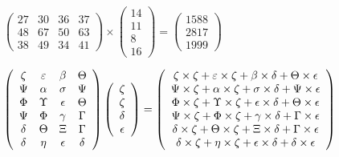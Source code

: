 \documentclass[12pt]{article}
\begin{document}
\noindent{}
 
 

 
$\left( \begin{array}{ccccccccccccccc}
 27  & 
 30  & 
 36  & 
 37  \\ 
 48  & 
 67  & 
 50  & 
 63  \\ 
 38  & 
 49  & 
 34  & 
 41
\end{array}\right) \times
\left( \begin{array}{c}
 14  \\ 
 11  \\ 
 8  \\ 
 16
\end{array}\right)  =
\left( \begin{array}{c}
 1588  \\ 
 2817  \\ 
 1999
\end{array}\right)  $
 
$  %
 \left( \begin{array}
 {
 c
 c
 c
 c
 }
                    \zeta & 
 \varepsilon & 
 \beta & 
 \Theta \\ 
 \Psi & 
 \alpha & 
 \sigma & 
 \Psi \\ 
 \Phi & 
 \Upsilon & 
 \epsilon & 
 \Theta \\ 
 \Psi & 
 \Phi & 
 \gamma & 
 \Gamma \\ 
 \delta & 
 \Theta & 
                    \Xi & 
 \Gamma \\ 
 \delta & 
 \eta & 
 \epsilon & 
 \delta
 \end{array} \right)
 \left( \begin{array}
 {
 c
 }
                    \zeta \\ 
                    \zeta \\ 
 \delta \\ 
 \epsilon
 \end{array} \right)
=
  \left( \begin{array}
 {
 c
 }
                    \zeta \times                     \zeta   +  \varepsilon \times                     \zeta   +  \beta \times  \delta   +  \Theta \times  \epsilon \\ 
 \Psi \times                     \zeta   +  \alpha \times                     \zeta   +  \sigma \times  \delta   +  \Psi \times  \epsilon \\ 
 \Phi \times                     \zeta   +  \Upsilon \times                     \zeta   +  \epsilon \times  \delta   +  \Theta \times  \epsilon \\ 
 \Psi \times                     \zeta   +  \Phi \times                     \zeta   +  \gamma \times  \delta   +  \Gamma \times  \epsilon \\ 
 \delta \times                     \zeta   +  \Theta \times                     \zeta   +                     \Xi \times  \delta   +  \Gamma \times  \epsilon \\ 
 \delta \times                     \zeta   +  \eta \times                     \zeta   +  \epsilon \times  \delta   +  \delta \times  \epsilon
 \end{array} \right)
$
 
\end{document}
